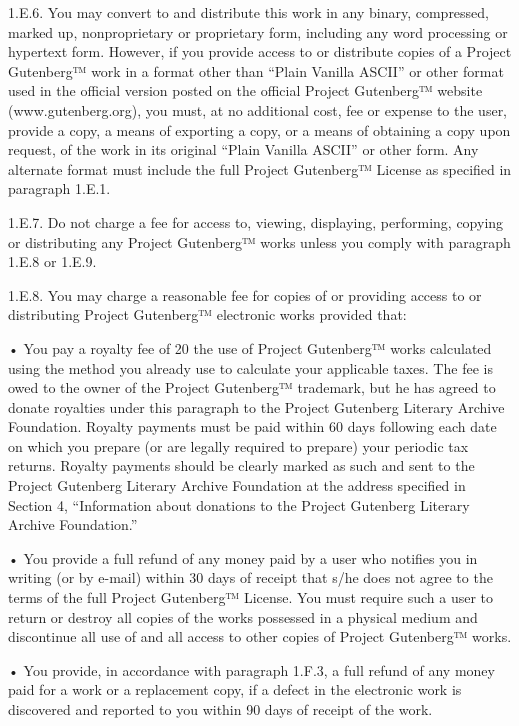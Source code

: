 1.E.6. You may convert to and distribute this work in any binary,
compressed, marked up, nonproprietary or proprietary form, including
any word processing or hypertext form. However, if you provide access
to or distribute copies of a Project Gutenberg™ work in a format
other than “Plain Vanilla ASCII” or other format used in the official
version posted on the official Project Gutenberg™ website
(www.gutenberg.org), you must, at no additional cost, fee or expense
to the user, provide a copy, a means of exporting a copy, or a means
of obtaining a copy upon request, of the work in its original “Plain
Vanilla ASCII” or other form. Any alternate format must include the
full Project Gutenberg™ License as specified in paragraph 1.E.1.

1.E.7. Do not charge a fee for access to, viewing, displaying,
performing, copying or distributing any Project Gutenberg™ works
unless you comply with paragraph 1.E.8 or 1.E.9.

1.E.8. You may charge a reasonable fee for copies of or providing
access to or distributing Project Gutenberg™ electronic works
provided that:

    • You pay a royalty fee of 20%
        the use of Project Gutenberg™ works calculated using the method
        you already use to calculate your applicable taxes. The fee is owed
        to the owner of the Project Gutenberg™ trademark, but he has
        agreed to donate royalties under this paragraph to the Project
        Gutenberg Literary Archive Foundation. Royalty payments must be paid
        within 60 days following each date on which you prepare (or are
        legally required to prepare) your periodic tax returns. Royalty
        payments should be clearly marked as such and sent to the Project
        Gutenberg Literary Archive Foundation at the address specified in
        Section 4, “Information about donations to the Project Gutenberg
        Literary Archive Foundation.”
    
    • You provide a full refund of any money paid by a user who notifies
        you in writing (or by e-mail) within 30 days of receipt that s/he
        does not agree to the terms of the full Project Gutenberg™
        License. You must require such a user to return or destroy all
        copies of the works possessed in a physical medium and discontinue
        all use of and all access to other copies of Project Gutenberg™
        works.
    
    • You provide, in accordance with paragraph 1.F.3, a full refund of
        any money paid for a work or a replacement copy, if a defect in the
        electronic work is discovered and reported to you within 90 days of
        receipt of the work.
    
